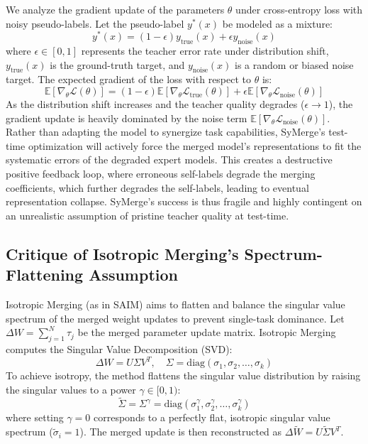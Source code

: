 \documentclass{article}
\begin{document}
We analyze the gradient update of the parameters $\theta$ under cross-entropy loss with noisy pseudo-labels. Let the pseudo-label $y^*(x)$ be modeled as a mixture:
\begin{equation}
    y^*(x) = (1 - \epsilon) y_{\text{true}}(x) + \epsilon y_{\text{noise}}(x)
\end{equation}
where $\epsilon \in [0, 1]$ represents the teacher error rate under distribution shift, $y_{\text{true}}(x)$ is the ground-truth target, and $y_{\text{noise}}(x)$ is a random or biased noise target. The expected gradient of the loss with respect to $\theta$ is:
\begin{equation}
    \mathbb{E}[\nabla_\theta \mathcal{L}(\theta)] = (1 - \epsilon) \mathbb{E}[\nabla_\theta \mathcal{L}_{\text{true}}(\theta)] + \epsilon \mathbb{E}[\nabla_\theta \mathcal{L}_{\text{noise}}(\theta)]
\end{equation}
As the distribution shift increases and the teacher quality degrades ($\epsilon \to 1$), the gradient update is heavily dominated by the noise term $\mathbb{E}[\nabla_\theta \mathcal{L}_{\text{noise}}(\theta)]$. Rather than adapting the model to synergize task capabilities, SyMerge's test-time optimization will actively force the merged model's representations to fit the systematic errors of the degraded expert models. This creates a destructive positive feedback loop, where erroneous self-labels degrade the merging coefficients, which further degrades the self-labels, leading to eventual representation collapse. SyMerge's success is thus fragile and highly contingent on an unrealistic assumption of pristine teacher quality at test-time.

\subsection{Critique of Isotropic Merging's Spectrum-Flattening Assumption}
Isotropic Merging (as in SAIM) \cite{marczak2025isotropic} aims to flatten and balance the singular value spectrum of the merged weight updates to prevent single-task dominance. Let $\Delta W = \sum_{j=1}^N \tau_j$ be the merged parameter update matrix. Isotropic Merging computes the Singular Value Decomposition (SVD):
\begin{equation}
    \Delta W = U \Sigma V^T, \quad \Sigma = \text{diag}(\sigma_1, \sigma_2, \dots, \sigma_k)
\end{equation}
To achieve isotropy, the method flattens the singular value distribution by raising the singular values to a power $\gamma \in [0, 1)$:
\begin{equation}
    \tilde{\Sigma} = \Sigma^\gamma = \text{diag}(\sigma_1^\gamma, \sigma_2^\gamma, \dots, \sigma_k^\gamma)
\end{equation}
where setting $\gamma = 0$ corresponds to a perfectly flat, isotropic singular value spectrum ($\tilde{\sigma}_i = 1$). The merged update is then reconstructed as $\Delta \tilde{W} = U \tilde{\Sigma} V^T$.
\end{document}
